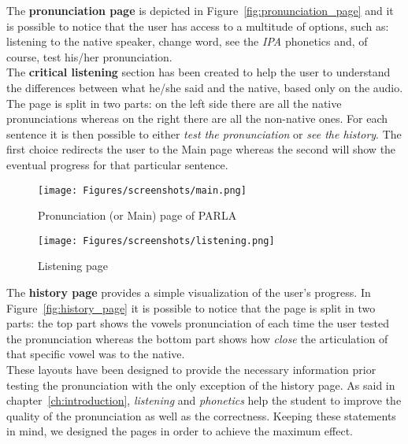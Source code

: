 \noindent The \textbf{pronunciation page} is depicted in Figure~\ref{fig:pronunciation_page} and it is possible to notice that the user has access to a multitude of options, such as: listening to the native speaker, change word, see the \textit{IPA} phonetics and, of course, test his/her pronunciation. \\

\noindent The \textbf{critical listening} section has been created to help the user to understand the differences between what he/she said and the native, based only on the audio. The page is split in two parts: on the left side there are all the native pronunciations whereas on the right there are all the non-native ones. For each sentence it is then possible to either \textit{test the pronunciation} or \textit{see the history}. The first choice redirects the user to the Main page whereas the second will show the eventual progress for that particular sentence. \\

\begin{figure}[!ht]
	\centering
	\begin{minipage}{.5\textwidth}
		\centering
		\texttt{[image: Figures/screenshots/main.png]}
		\caption{Pronunciation (or Main) page of PARLA}
		\label{fig:pronunciation_page}
	\end{minipage}%
	\begin{minipage}{.5\textwidth}
		\centering
		\texttt{[image: Figures/screenshots/listening.png]}
		\caption{Listening page}
		\label{fig:listening_page}
	\end{minipage}
\end{figure}

\noindent The \textbf{history page} provides a simple visualization of the user's progress. In Figure~\ref{fig:history_page} it is possible to notice that the page is split in two parts: the top part shows the vowels pronunciation of each time the user tested the pronunciation whereas the bottom part shows how \textit{close} the articulation of that specific vowel was to the native. \\

\noindent These layouts have been designed to provide the necessary information prior testing the pronunciation with the only exception of the history page. As said in chapter~\ref{ch:introduction}, \textit{listening} and \textit{phonetics} help the student to improve the quality of the pronunciation as well as the correctness. Keeping these statements in mind, we designed the pages in order to achieve the maximum effect. \\

